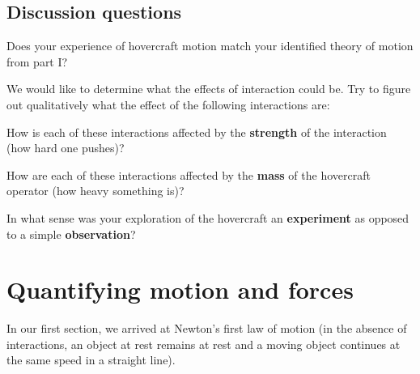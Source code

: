 \documentclass{handout}
\begin{document}
\subsection{Discussion questions}
\begin{questions}
\question Does your experience of hovercraft motion match your identified theory of motion from part I?

\answerspace{1in}

\question We would like to determine what the effects of interaction could be. Try
to figure out qualitatively what the effect of the following
interactions are:

\question How is each of these interactions affected by the \textbf{strength} of
the interaction (how hard one pushes)?

\answerspace{1.5in}

\question How are each of these interactions affected by the \textbf{mass} of the
hovercraft operator (how heavy something is)?

\answerspace{1.5in}

\question In what sense was your exploration of the hovercraft an \textbf{experiment} as opposed to a simple \textbf{observation}? 

\answerspace{1.5in}

\end{questions}

\clearpage
\section{Quantifying motion and
forces}\label{quantifying-motion-and-forces}
In our first section, we arrived at Newton's first law of motion (in the absence of interactions, an object at rest remains at rest and a moving object continues at the same speed in a straight line).
\end{document}
